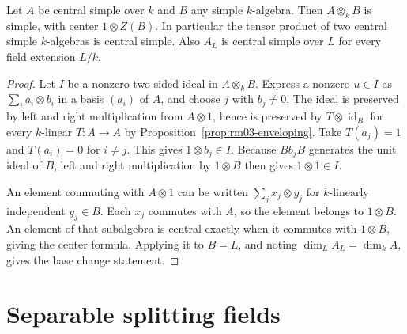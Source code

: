 \begin{proposition}
\label{prop:rm03-csa-tensor}
Let \(A\) be central simple over \(k\) and \(B\) any simple
\(k\)-algebra. Then \(A\otimes_k B\) is simple, with center
\(1\otimes Z(B)\). In particular the tensor product of two central
simple \(k\)-algebras is central simple. Also \(A_L\) is central
simple over \(L\) for every field extension \(L/k\).
\end{proposition}
\begin{proof}
Let \(I\) be a nonzero two-sided ideal in \(A\otimes_k B\). Express
a nonzero \(u\in I\) as \(\sum_i a_i\otimes b_i\) in a basis
\((a_i)\) of \(A\), and choose \(j\) with \(b_j\ne 0\).
The ideal is preserved by left and right multiplication from
\(A\otimes 1\), hence is preserved by \(T\otimes\operatorname{id}_B\)
for every \(k\)-linear \(T:A\to A\) by
Proposition~\ref{prop:rm03-enveloping}. Take \(T(a_j)=1\) and
\(T(a_i)=0\) for \(i\ne j\). This gives \(1\otimes b_j\in I\).
Because \(Bb_jB\) generates the unit ideal of \(B\), left and
right multiplication by \(1\otimes B\) then gives \(1\otimes 1\in I\).

An element commuting with \(A\otimes 1\) can be written
\(\sum_j x_j\otimes y_j\) for \(k\)-linearly independent
\(y_j\in B\). Each \(x_j\) commutes with \(A\), so the element
belongs to \(1\otimes B\). An element of that subalgebra is central
exactly when it commutes with \(1\otimes B\), giving the center formula.
Applying it to \(B=L\), and noting
\(\dim_L A_L=\dim_k A\), gives the base change statement.
\end{proof}

\section{Separable splitting fields}

